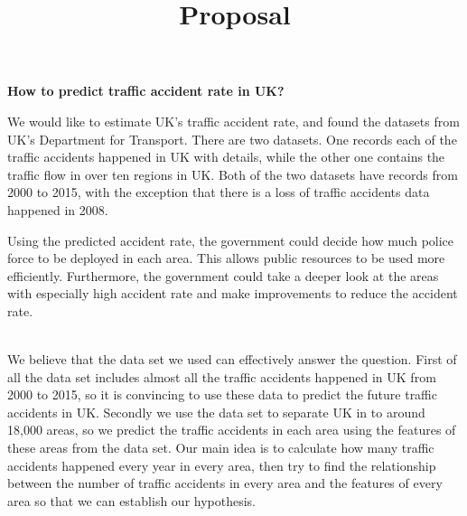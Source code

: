 \documentclass{article}
\title {\textbf{Proposal}}
\begin{document}
\date{}\maketitle

{\textbf{\fontsize{15}{30}\selectfont How to predict traffic accident rate in UK?}

}

\n
{\fontsize{14}{16}\selectfont 
{We would like to estimate UK’s traffic accident rate, and found the datasets from UK’s Department for Transport. There are two datasets. One records each of the traffic accidents happened in UK with details, while the other one contains the traffic flow in over ten regions in UK. Both of the two datasets have records from 2000 to 2015, with the exception that there is a loss of traffic accidents data happened in 2008.


Using the predicted accident rate, the government could decide how much police force to be deployed in each area. This allows public resources to be used more efficiently. Furthermore, the government could take a deeper look at the areas with especially high accident rate and make improvements to reduce the accident rate. }

{\fontsize{14}{16}\selectfont 
\\
We believe that the data set we used can effectively answer the question. First of all the data set includes almost all the traffic accidents happened in UK from 2000 to 2015, so it is convincing to use these data to predict the future traffic accidents in UK. Secondly we use the data set to separate UK in to around 18,000 areas, so we predict the traffic accidents in each area using the features of these areas from the data set. Our main idea is to calculate how many traffic accidents happened every year in every area, then try to find the relationship between the number of traffic accidents in every area and the features of every area so that we can establish our hypothesis.
}}
\end{document}
